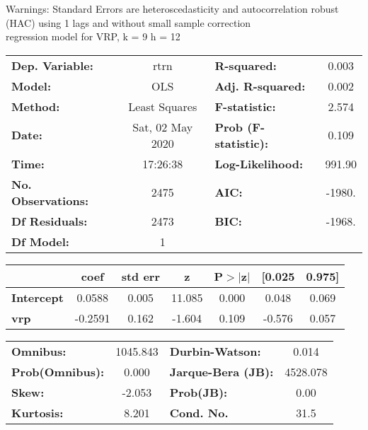 Warnings: \newline
 [1] Standard Errors are heteroscedasticity and autocorrelation robust (HAC) using 1 lags and without small sample correction\\ 

regression model for VRP, k = 9 h = 12\begin{center}
\begin{tabular}{lclc}
\toprule
\textbf{Dep. Variable:}    &       rtrn       & \textbf{  R-squared:         } &     0.003   \\
\textbf{Model:}            &       OLS        & \textbf{  Adj. R-squared:    } &     0.002   \\
\textbf{Method:}           &  Least Squares   & \textbf{  F-statistic:       } &     2.574   \\
\textbf{Date:}             & Sat, 02 May 2020 & \textbf{  Prob (F-statistic):} &    0.109    \\
\textbf{Time:}             &     17:26:38     & \textbf{  Log-Likelihood:    } &    991.90   \\
\textbf{No. Observations:} &        2475      & \textbf{  AIC:               } &    -1980.   \\
\textbf{Df Residuals:}     &        2473      & \textbf{  BIC:               } &    -1968.   \\
\textbf{Df Model:}         &           1      & \textbf{                     } &             \\
\bottomrule
\end{tabular}
\begin{tabular}{lcccccc}
                   & \textbf{coef} & \textbf{std err} & \textbf{z} & \textbf{P$> |$z$|$} & \textbf{[0.025} & \textbf{0.975]}  \\
\midrule
\textbf{Intercept} &       0.0588  &        0.005     &    11.085  &         0.000        &        0.048    &        0.069     \\
\textbf{vrp}       &      -0.2591  &        0.162     &    -1.604  &         0.109        &       -0.576    &        0.057     \\
\bottomrule
\end{tabular}
\begin{tabular}{lclc}
\textbf{Omnibus:}       & 1045.843 & \textbf{  Durbin-Watson:     } &    0.014  \\
\textbf{Prob(Omnibus):} &   0.000  & \textbf{  Jarque-Bera (JB):  } & 4528.078  \\
\textbf{Skew:}          &  -2.053  & \textbf{  Prob(JB):          } &     0.00  \\
\textbf{Kurtosis:}      &   8.201  & \textbf{  Cond. No.          } &     31.5  \\
\bottomrule
\end{tabular}
\end{center}

